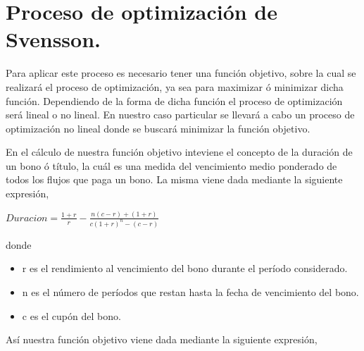 
\newpage

\section{Proceso de optimizaci\'on de Svensson.}


\hspace{0.4cm} Para aplicar este proceso es necesario tener una funci\'on objetivo, sobre la cual se realizar\'a el proceso de optimizaci\'on, ya sea para maximizar \'o minimizar dicha funci\'on. Dependiendo de la forma de dicha funci\'on el proceso de optimizaci\'on ser\'a lineal o no lineal. En nuestro caso particular se llevar\'a a cabo un proceso de optimizaci\'on no lineal donde se buscar\'a minimizar la funci\'on objetivo.


\hspace{0.4cm} En el c\'alculo de nuestra funci\'on objetivo inteviene el concepto de la duraci\'on de un bono \'o t\'itulo, la cu\'al es una medida del vencimiento medio ponderado de todos los flujos que paga un bono. La misma viene dada mediante la siguiente expresi\'on, \\

\begin{center}

$\displaystyle{Duracion = \frac{1+r}{r} - \frac{n(c-r)+(1+r)}{c(1+r)^{n}-(c-r)}}$

\end{center}


\noindent donde

\begin{itemize}
  \item r es el rendimiento al vencimiento del bono durante el per\'iodo considerado.
  \item n es el n\'umero de per\'iodos que restan hasta la fecha de vencimiento del bono.
  \item c es el cup\'on del bono.
\end{itemize}


\hspace{0.4cm} As\'i nuestra funci\'on objetivo viene dada mediante la siguiente expresi\'on,

\vspace{0.2cm}

